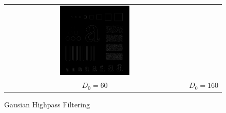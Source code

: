 \documentclass[a4paper]{article}
\begin{document}
\begin{enumerate}
\begin{figure}[H]
\begin{tabular}{cc}
    \includegraphics[width=0.4\textwidth]{../lab2ex2/characters-GHPF-D160.png} \\
    $D_{0} = 60$ & $D_{0} = 160$ \\
\end{tabular}
\caption{Gausian Highpass Filtering}
\end{figure}
\end{enumerate}
\end{document}
